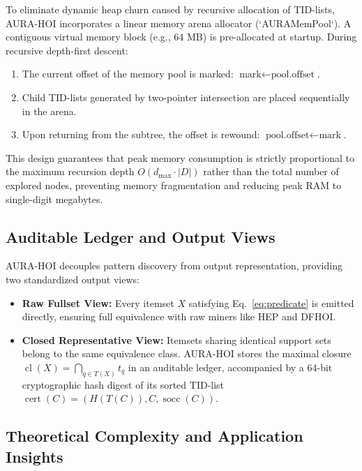 \documentclass[runningheads,orivec]{llncs}
\newcommand{\socc}{\operatorname{socc}}
\newcommand{\cl}{\operatorname{cl}}
\newcommand{\AURA}{\textsc{AURA-HOI}}
\newcommand{\HEP}{\textsc{HEP}}
\newcommand{\DFHOI}{\textsc{DFHOI}}
\begin{document}
To eliminate dynamic heap churn caused by recursive allocation of TID-lists, \AURA{} incorporates a linear memory arena allocator (`AURAMemPool`). A contiguous virtual memory block (e.g., 64 MB) is pre-allocated at startup. During recursive depth-first descent:
\begin{enumerate}
    \item The current offset of the memory pool is marked: $\text{mark} \leftarrow \text{pool.offset}$.
    \item Child TID-lists generated by two-pointer intersection are placed sequentially in the arena.
    \item Upon returning from the subtree, the offset is rewound: $\text{pool.offset} \leftarrow \text{mark}$.
\end{enumerate}
This design guarantees that peak memory consumption is strictly proportional to the maximum recursion depth $O(d_{\max} \cdot |D|)$ rather than the total number of explored nodes, preventing memory fragmentation and reducing peak RAM to single-digit megabytes.

\subsection{Auditable Ledger and Output Views}

\AURA{} decouples pattern discovery from output representation, providing two standardized output views:
\begin{itemize}
    \item \textbf{Raw Fullset View:} Every itemset $X$ satisfying Eq.~\eqref{eq:predicate} is emitted directly, ensuring full equivalence with raw miners like \HEP{} and \DFHOI.
    \item \textbf{Closed Representative View:} Itemsets sharing identical support sets belong to the same equivalence class. \AURA{} stores the maximal closure $\cl(X) = \bigcap_{q \in T(X)} t_q$ in an auditable ledger, accompanied by a 64-bit cryptographic hash digest of its sorted TID-list $\operatorname{cert}(C) = (H(T(C)), C, \socc(C))$.
\end{itemize}

\subsection{Theoretical Complexity and Application Insights}
\end{document}
